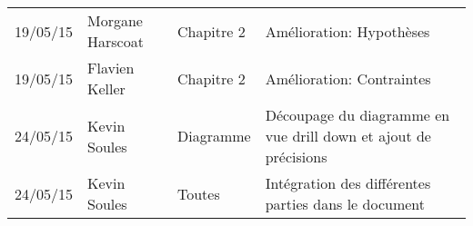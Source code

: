 \small
\begin{tabular}{|p{1.5cm}| >{\raggedright}p{2.9cm}| >{\raggedright}p{3.2cm}|p{7.2cm}|}
  \hline
  \rowcolor{Gainsboro} \color{Navy}{\bfseries Date}  & \color{Navy}{\bfseries Auteur} & \color{Navy}{\bfseries Section(s)}  &\color{Navy}{\bfseries Commentaires} \\
  \hline
  19/05/15 & Morgane Harscoat & Chapitre 2  & Amélioration: Hypothèses \\
  \hline
  19/05/15 & Flavien Keller & Chapitre 2 & Amélioration: Contraintes \\
  \hline
  24/05/15 & Kevin Soules & Diagramme  & Découpage du diagramme en vue drill down et ajout de précisions\\
  \hline
  24/05/15 & Kevin Soules & Toutes & Intégration des différentes parties dans le document\\
  \hline
\end{tabular}
\normalsize
